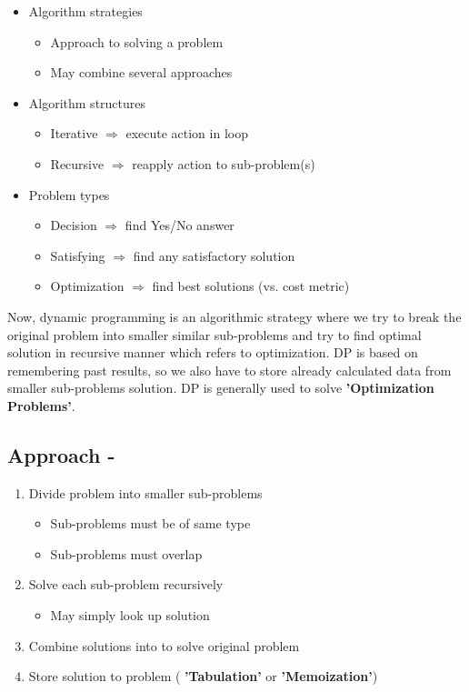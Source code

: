 \documentclass[12pt]{article}
\begin{document}
\begin{itemize}[label=$\diamond$]
\item Algorithm strategies
\begin{itemize}
\item Approach to solving a problem
\item May combine several approaches
\end{itemize}
\item Algorithm structures
\begin{itemize}
\item Iterative $\Rightarrow $ execute action in loop
\item Recursive  $\Rightarrow$ reapply action to sub-problem(s)
\end{itemize}
\item Problem types
\begin{itemize}
\item Decision $\Rightarrow$ find Yes/No answer
\item Satisfying $\Rightarrow$ find any satisfactory solution
\item Optimization $\Rightarrow$ find best solutions (vs. cost metric)
\end{itemize}
\end{itemize}
Now, dynamic programming is an algorithmic strategy where we try to break the original problem into smaller similar sub-problems and try to find optimal solution in recursive manner which refers to optimization. DP is based on remembering past results, so we also have to store already calculated data from smaller sub-problems solution. DP is generally used to solve \textbf{'Optimization Problems'}.

\subsection{Approach -}
\begin{enumerate}[label=(\roman*)]
\item Divide problem into smaller sub-problems 
\begin{itemize}
\item Sub-problems must be of same type
\item Sub-problems must overlap
\end{itemize}
\item Solve each sub-problem recursively
\begin{itemize}
\item May simply look up solution
\end{itemize}
\item Combine solutions into to solve original problem
\item Store solution to problem ( \textbf{'Tabulation'}  or \textbf{'Memoization'})
\end{enumerate}
\vspace{3mm} 
\end{document}
